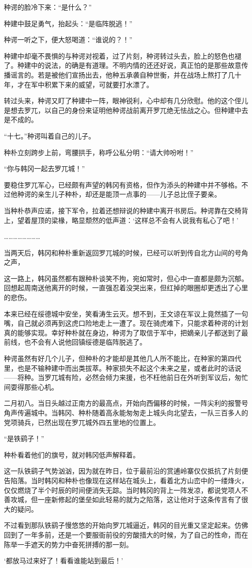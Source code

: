 种谔的脸冷下来：“是什么？”

种建中鼓足勇气，抬起头：“是临阵脱逃！”

种谔一听之下，便大怒喝道：“谁说的？！”

种建中却毫不畏惧的与种谔对视着，过了片刻，种谔转过头去，脸上的怒色也褪了。种建中的说法，的确是有道理。不明内情的还还好说，真正怕的是那些故意传播谣言的。若是被他们宣扬出去，他种五承袭自种世衡，并在战场上熬打了几十年，才在军中积累下来的威望，可就要打水漂了。

转过头来，种谔又盯了种建中一阵，眼神锐利，心中却有几分欣慰。他的这个侄儿是想去罗兀，以自己的身份来证明他种谔战前离开罗兀绝无怯战之心。但种建中去是不成的。

“十七。”种谔叫着自己的儿子。

种朴立刻跨步上前，弯腰拱手，称呼公私分明：“请大帅吩咐！”

“你与韩冈一起去罗兀城！”

要稳住罗兀军心，已经颇有声望的韩冈有资格，但作为添头的种建中并不够格。不过他种谔的亲生儿子种朴，却还是能顶一点事的——儿子总比侄子要亲。

当种朴恭声应诺，接下军令，拉着还想辩说的种建中离开书房后。种谔靠在交椅背上，望着屋顶的梁椽，略显颓然的低声道：‘这样总不会有人说我有私心了吧！’

……………………

当两天后，韩冈和种朴重新返回罗兀城的时候，已经可以听到传自北方山间的号角之声，

这一路上，韩冈虽然都有跟种朴谈笑不拘，宛如常时，但心中一直都是颇为沉郁。回想起周南送他离开的时候，一直强忍着没哭出来，但红掉的眼圈却更透出了心里的悲伤。

本来已经在绥德城中安坐，笑看涛生云灭。想不到，王文谅在军议上竟然插了一句嘴，自己就必须再到这虎口险地走上一遭了。现在骑虎难下，只能求着种谔的计划真的能够实现。幸好种朴就在身边，种谔为了取信于军中，把嫡亲儿子都送到了最前线，也不会有人说他回镇绥德是临阵脱逃了。

种谔虽然有好几个儿子，但种朴的才能却是其他几人所不能比，在种家的第四代里，也是不输种建中而出类拔萃。种家损失不起这个未来之星，或者此时的话说——将种。当罗兀城有险，必然会倾力来援，也不枉他前日在外听到军议后，匆忙间耍得那些心机。

二月初八。当日头越过正南方的最高点，开始向西偏移的时候，一阵尖利的报警号角声传遍城中。当韩冈、种朴随着高永能匆匆走上城头向北望去，一队三百多人的党项骑兵，已然出现在罗兀城外四五里地的位置上。

“是铁鹞子！”

种朴看着他们的旗号，就对韩冈低声解释着。

这一队铁鹞子气势汹汹，因为就在昨日，位于最前沿的赏逋岭寨仅仅抵抗了片刻便告陷落。当时韩冈和种朴也像现在这样站在城头上，看着北方山峦中的一缕烽火，仅仅燃烧了半个时辰的时间便消失无踪。当时韩冈的背上一阵发凉，都说党项人不善攻城，但一座新修起的堡垒如此轻易的就为之陷落，这让他对于这条传言有了很大的疑问。

不过看到那队铁鹞子慢悠悠的开始向罗兀城逼近，韩冈的目光重又坚定起来。仿佛回到了一年多前，还是一个要服衙前役的穷酸措大的时候，为了自己的性命，而在陈举一手遮天的势力中奋死拼搏的那一刻。

‘都放马过来好了！看看谁能站到最后！’

